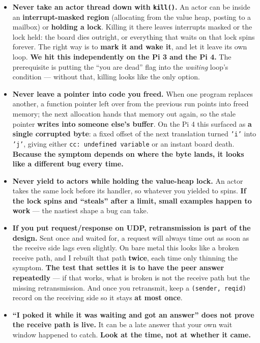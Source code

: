 \documentclass[11pt,a4paper]{article}
\begin{document}
\begin{itemize}
\item \textbf{Never take an actor thread down with \texttt{kill()}.}
  An actor can be inside an \textbf{interrupt-masked region} (allocating from
  the value heap, posting to a mailbox) or \textbf{holding a lock}. Killing it
  there leaves interrupts masked or the lock held: the board dies outright, or
  everything that waits on that lock spins forever. The right way is to
  \textbf{mark it and wake it}, and let it leave its own loop.
  \textbf{We hit this independently on the Pi 3 and the Pi 4.} The prerequisite
  is putting the ``you are dead'' flag into the \emph{waiting} loop's condition
  --- without that, killing looks like the only option.
\item \textbf{Never leave a pointer into code you freed.} When one program
  replaces another, a function pointer left over from the previous run points
  into freed memory; the next allocation hands that memory out again, so the
  stale pointer \textbf{writes into someone else's buffer}. On the Pi 4 this
  surfaced as \textbf{a single corrupted byte}: a fixed offset of the next
  translation turned \texttt{'i'} into \texttt{'j'}, giving either
  \texttt{cc: undefined variable} or an instant board death.
  \textbf{Because the symptom depends on where the byte lands, it looks like a
  different bug every time.}
\item \textbf{Never yield to actors while holding the value-heap lock.} An
  actor takes the same lock before its handler, so whatever you yielded to
  spins. \textbf{If the lock spins and ``steals'' after a limit, small examples
  happen to work} --- the nastiest shape a bug can take.
\item \textbf{If you put request/response on UDP, retransmission is part of the
  design.} Sent once and waited for, a request will always time out as soon as
  the receive side lags even slightly. On bare metal this looks like a broken
  receive path, and I rebuilt that path \textbf{twice}, each time only thinning
  the symptom. \textbf{The test that settles it is to have the peer answer
  repeatedly} --- if that works, what is broken is not the receive path but the
  missing retransmission. And once you retransmit, keep a
  \texttt{(sender, reqid)} record on the receiving side so it stays
  \textbf{at most once}.
\item \textbf{``I poked it while it was waiting and got an answer'' does not
  prove the receive path is live.} It can be a late answer that your own wait
  window happened to catch. \textbf{Look at the time, not at whether it came.}

\end{itemize}
\end{document}
